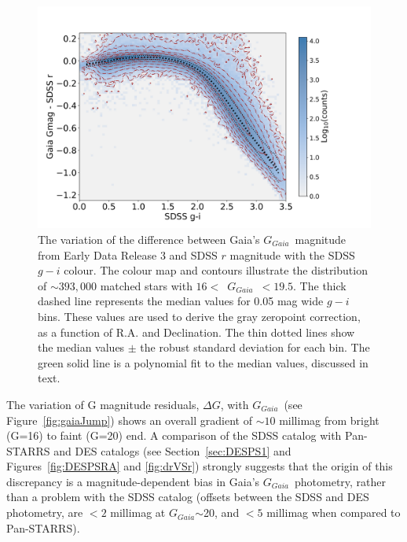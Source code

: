 \documentclass[fleqn,usenatbib]{mnras}
\newcommand{\GG}{\hbox{$G_{Gaia}$}}
\begin{document}
\begin{figure}
  \centering\includegraphics[width=0.99\columnwidth]{figures/KTGrVSgi-poly.png} 
\caption{The variation of the difference between Gaia's \GG\ magnitude from Early Data Release 3
and SDSS $r$ magnitude with the SDSS $g-i$ colour.
The  colour map and contours illustrate the distribution of $\sim 393,000$ matched stars with 
$16<$~\GG~$<19.5$. The thick dashed line represents the median values for 0.05 mag wide $g-i$ bins. 
These values are used to derive the gray zeropoint correction, as a function of R.A. and Declination.
The thin dotted lines show the median values $\pm$ the robust standard deviation for 
each bin. The green solid line is a polynomial fit to the median values, discussed in text. }
\label{fig:GrVSgi}
\end{figure}


The variation of G magnitude residuals, $\Delta G$, with \GG\ (see Figure~\ref{fig:gaiaJump}) shows 
an overall gradient of $\sim10$ millimag from bright (G=16) to faint (G=20) end. 
A comparison of the SDSS catalog with Pan-STARRS and DES catalogs (see 
Section~\ref{sec:DESPS1} and Figures~\ref{fig:DESPSRA} and \ref{fig:drVSr}) strongly suggests that the
origin of this discrepancy is a magnitude-dependent bias in Gaia's \GG\ photometry,
rather than a problem with the SDSS catalog (offsets between the SDSS and DES
photometry,  are $<2$ millimag at \GG$\sim$20, and $<5$ millimag when
compared to Pan-STARRS). 
\end{document}
